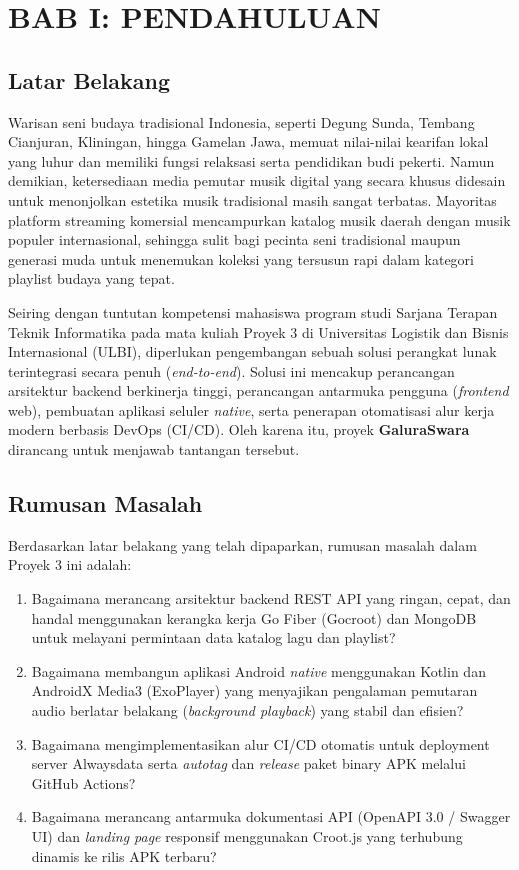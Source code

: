 \section{BAB I: PENDAHULUAN}

\subsection{Latar Belakang}
Warisan seni budaya tradisional Indonesia, seperti Degung Sunda, Tembang Cianjuran, Kliningan, hingga Gamelan Jawa, memuat nilai-nilai kearifan lokal yang luhur dan memiliki fungsi relaksasi serta pendidikan budi pekerti. Namun demikian, ketersediaan media pemutar musik digital yang secara khusus didesain untuk menonjolkan estetika musik tradisional masih sangat terbatas. Mayoritas platform streaming komersial mencampurkan katalog musik daerah dengan musik populer internasional, sehingga sulit bagi pecinta seni tradisional maupun generasi muda untuk menemukan koleksi yang tersusun rapi dalam kategori playlist budaya yang tepat.

Seiring dengan tuntutan kompetensi mahasiswa program studi Sarjana Terapan Teknik Informatika pada mata kuliah Proyek 3 di Universitas Logistik dan Bisnis Internasional (ULBI), diperlukan pengembangan sebuah solusi perangkat lunak terintegrasi secara penuh (\textit{end-to-end}). Solusi ini mencakup perancangan arsitektur backend berkinerja tinggi, perancangan antarmuka pengguna (\textit{frontend} web), pembuatan aplikasi seluler \textit{native}, serta penerapan otomatisasi alur kerja modern berbasis DevOps (CI/CD). Oleh karena itu, proyek \textbf{GaluraSwara} dirancang untuk menjawab tantangan tersebut.

\subsection{Rumusan Masalah}
Berdasarkan latar belakang yang telah dipaparkan, rumusan masalah dalam Proyek 3 ini adalah:
\begin{enumerate}
    \item Bagaimana merancang arsitektur backend REST API yang ringan, cepat, dan handal menggunakan kerangka kerja Go Fiber (Gocroot) dan MongoDB untuk melayani permintaan data katalog lagu dan playlist?
    \item Bagaimana membangun aplikasi Android \textit{native} menggunakan Kotlin dan AndroidX Media3 (ExoPlayer) yang menyajikan pengalaman pemutaran audio berlatar belakang (\textit{background playback}) yang stabil dan efisien?
    \item Bagaimana mengimplementasikan alur CI/CD otomatis untuk deployment server Alwaysdata serta \textit{autotag} dan \textit{release} paket binary APK melalui GitHub Actions?
    \item Bagaimana merancang antarmuka dokumentasi API (OpenAPI 3.0 / Swagger UI) dan \textit{landing page} responsif menggunakan Croot.js yang terhubung dinamis ke rilis APK terbaru?
\end{enumerate}

